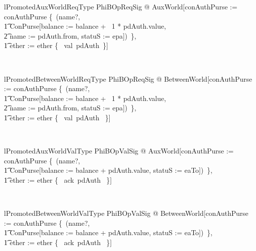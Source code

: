 \begin{LNewLemma}
\begin{theorem}{lPromotedAuxWorldReqType}
    \forall PhiBOpReqSig @ AuxWorld[conAuthPurse := conAuthPurse \oplus \{~(name?, \\
        \t1 \theta ConPurse[balance := balance + \negate~1 * pdAuth.value, \\
            \t2 name := pdAuth.from, statuS := epa])~\}, \\
        \t1 ether := ether \cup \{~ val~pdAuth~\}]
\end{theorem}~\end{LNewLemma}

\begin{LNewLemma}
\begin{theorem}{lPromotedBetweenWorldReqType}
    \forall PhiBOpReqSig @ BetweenWorld[conAuthPurse := conAuthPurse \oplus \{~(name?, \\
        \t1 \theta ConPurse[balance := balance + \negate~1 * pdAuth.value, \\
            \t2 name := pdAuth.from, statuS := epa])~\}, \\
        \t1 ether := ether \cup \{~ val~pdAuth ~\}]
\end{theorem}~\end{LNewLemma}

\begin{LNewLemma}
\begin{theorem}{lPromotedAuxWorldValType}
    \forall PhiBOpValSig @ AuxWorld[conAuthPurse := conAuthPurse \oplus \{~(name?, \\
        \t1 \theta ConPurse[balance := balance + pdAuth.value, statuS := eaTo])~\}, \\
        \t1 ether := ether \cup \{~ ack~pdAuth ~\}]
\end{theorem}~\end{LNewLemma}

\begin{LNewLemma}
\begin{theorem}{lPromotedBetweenWorldValType}
    \forall PhiBOpValSig @ BetweenWorld[conAuthPurse := conAuthPurse \oplus \{~(name?, \\
        \t1 \theta ConPurse[balance := balance + pdAuth.value, statuS := eaTo])~\}, \\
        \t1 ether := ether \cup \{~ ack~pdAuth ~\}]
\end{theorem}~\end{LNewLemma}

